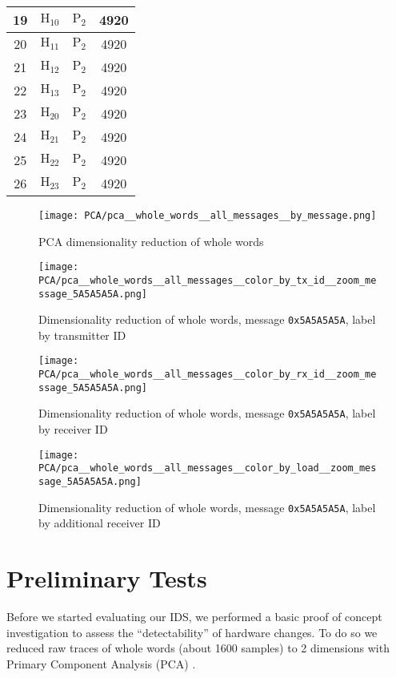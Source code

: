 \documentclass[compsoc,conference,a4paper,10pt,times]{IEEEtran}
\newcommand{\level}[1]{\section{#1}}
\newcommand{\level}[1]{\chapter{#1}}
\begin{document}
\begin{table}
\begin{tabular}{|c | c c c|}
      19 & \(\text{H}_{10}\) & \(\text{P}_2\) & 4920 \\
      \hline
      20 & \(\text{H}_{11}\) & \(\text{P}_2\) & 4920 \\
      \hline
      21 & \(\text{H}_{12}\) & \(\text{P}_2\) & 4920 \\
      \hline
      22 & \(\text{H}_{13}\) & \(\text{P}_2\) & 4920 \\
      \hline
      23 & \(\text{H}_{20}\) & \(\text{P}_2\) & 4920 \\
      \hline
      24 & \(\text{H}_{21}\) & \(\text{P}_2\) & 4920 \\
      \hline
      25 & \(\text{H}_{22}\) & \(\text{P}_2\) & 4920 \\
      \hline
      26 & \(\text{H}_{23}\) & \(\text{P}_2\) & 4920 \\
      \hline
    \end{tabular}
  \end{table}
 
  
  \begin{figure}[t]
    \centering
    \texttt{[image: PCA/pca\_\_whole\_words\_\_all\_messages\_\_by\_message.png]}
    \caption{PCA dimensionality reduction of whole words}
    \label{fig:pca_by_message}
  \end{figure}
  
 
  \begin{figure}[t]
    \centering
    \texttt{[image: PCA/pca\_\_whole\_words\_\_all\_messages\_\_color\_by\_tx\_id\_\_zoom\_message\_5A5A5A5A.png]}
    \caption{Dimensionality reduction of whole words, message \texttt{0x5A5A5A5A}, label by transmitter ID}
    \label{fig:pca_by_tx_id}
  
    \texttt{[image: PCA/pca\_\_whole\_words\_\_all\_messages\_\_color\_by\_rx\_id\_\_zoom\_message\_5A5A5A5A.png]}
    \caption{Dimensionality reduction of whole words, message \texttt{0x5A5A5A5A}, label by receiver ID}
    \label{fig:pca_by_rx_id}
  
    \centering
    \texttt{[image: PCA/pca\_\_whole\_words\_\_all\_messages\_\_color\_by\_load\_\_zoom\_message\_5A5A5A5A.png]}
    \caption{Dimensionality reduction of whole words, message \texttt{0x5A5A5A5A}, label by additional receiver ID}
    \label{fig:pca_by_load}
  \end{figure}
  
 
\level{Preliminary Tests} \label{PreliminaryTests}
  Before we started evaluating our IDS, we performed a basic proof of concept investigation to assess the ``detectability'' of hardware changes. To do so we reduced raw traces of whole words (about 1600 samples) to 2 dimensions with Primary Component Analysis (PCA) \cite{pearson1901liii}.
 
\end{document}
